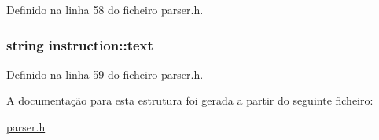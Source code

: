 Definido na linha 58 do ficheiro parser.\-h.

\hypertarget{structinstruction_af31af10ecfe7d2fdf154616d0aede8ea}{
\subsubsection[{text}]{\setlength{\rightskip}{0pt plus 5cm}string instruction\-::text}}\label{structinstruction_af31af10ecfe7d2fdf154616d0aede8ea}


Definido na linha 59 do ficheiro parser.\-h.



A documentação para esta estrutura foi gerada a partir do seguinte ficheiro\-:\begin{DoxyCompactItemize}
\item 
\hyperlink{parser_8h}{parser.\-h}\end{DoxyCompactItemize}
